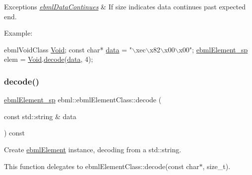 \begin{DoxyExceptions}{Exceptions}
{\em \mbox{\hyperlink{classebml_1_1ebmlDataContinues}{ebml\+Data\+Continues}}} & If \textquotesingle{}size\textquotesingle{} indicates \textquotesingle{}data\textquotesingle{} continues past expected end.\\
\hline
\end{DoxyExceptions}
Example\+: 
\begin{DoxyCode}
ebmlVoidClass \mbox{\hyperlink{namespaceebml_afbfd509d1cb71e416a07253746e886e9}{Void}};
\textcolor{keyword}{const} \textcolor{keywordtype}{char}* \mbox{\hyperlink{namespaceebml_a6365629b3110a3c5d0cde94d08aac26c}{data}} = \textcolor{stringliteral}{"\(\backslash\)xec\(\backslash\)x82\(\backslash\)x00\(\backslash\)x00"};
\mbox{\hyperlink{namespaceebml_adad533b7705a16bb360fe56380c5e7be}{ebmlElement\_sp}} elem = \mbox{\hyperlink{namespaceebml_afbfd509d1cb71e416a07253746e886e9}{Void}}.\mbox{\hyperlink{classebml_1_1ebmlElementClass_a9bda26f54e5d5a1e27aaaf0e124ec457}{decode}}(\mbox{\hyperlink{namespaceebml_a6365629b3110a3c5d0cde94d08aac26c}{data}}, 4);
\end{DoxyCode}
 \mbox{\label{classebml_1_1ebmlElementClass_a2e45d73cfc2bfda5b4731af42299aaf1}} 
\subsubsection{\texorpdfstring{decode()}{decode()}\hspace{0.1cm}{\footnotesize\ttfamily [4/6]}}
{\footnotesize\ttfamily \mbox{\hyperlink{namespaceebml_adad533b7705a16bb360fe56380c5e7be}{ebml\+Element\+\_\+sp}} ebml\+::ebml\+Element\+Class\+::decode (\begin{DoxyParamCaption}\item[{const std\+::string \&}]{data }\end{DoxyParamCaption}) const}

Create \mbox{\hyperlink{classebml_1_1ebmlElement}{ebml\+Element}} instance, decoding from a std\+::string.

This function delegates to ebml\+Element\+Class\+::decode(const char$\ast$, size\+\_\+t).


